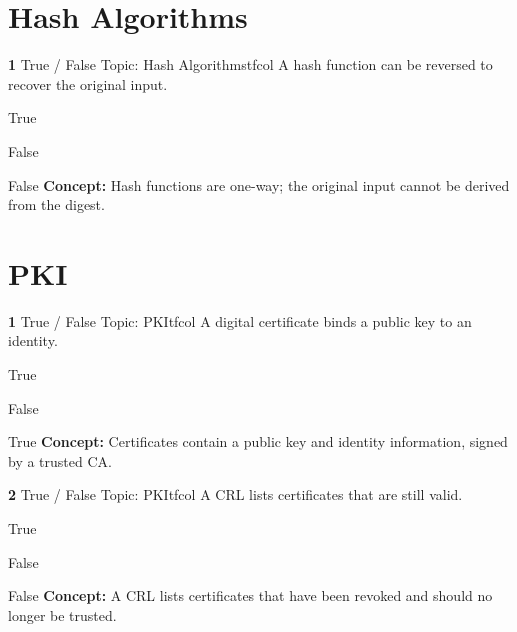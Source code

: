 \documentclass[10pt,a4paper]{article}
\begin{document}
\section{Hash Algorithms}
\begin{qcard}{\color{white}\textbf{1} \hfill \small True / False \textbar{} Topic: Hash Algorithms}{tfcol}
A hash function can be reversed to recover the original input.

\begin{qoptions}
\item True
\item False
\end{qoptions}
\begin{explainbox}{False}
\textbf{Concept:} Hash functions are one-way; the original input cannot be derived from the digest.
\end{explainbox}
\end{qcard}

\section{PKI}
\begin{qcard}{\color{white}\textbf{1} \hfill \small True / False \textbar{} Topic: PKI}{tfcol}
A digital certificate binds a public key to an identity.

\begin{qoptions}
\item True
\item False
\end{qoptions}
\begin{explainbox}{True}
\textbf{Concept:} Certificates contain a public key and identity information, signed by a trusted CA.
\end{explainbox}
\end{qcard}

\begin{qcard}{\color{white}\textbf{2} \hfill \small True / False \textbar{} Topic: PKI}{tfcol}
A CRL lists certificates that are still valid.

\begin{qoptions}
\item True
\item False
\end{qoptions}
\begin{explainbox}{False}
\textbf{Concept:} A CRL lists certificates that have been revoked and should no longer be trusted.
\end{explainbox}
\end{qcard}
\end{document}
